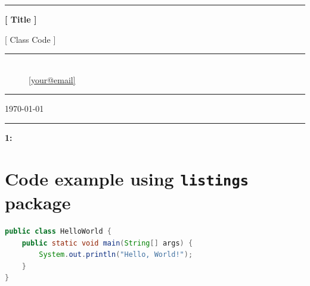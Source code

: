 \documentclass[]{article}
\begin{document}
\begin{titlepage}
    \centering

    \vspace*{1cm}

    \rule{.7\textwidth}{1pt}

    \vspace{.7\baselineskip}
    {\huge \textbf{[ Title ]}}

    \vspace*{.5cm}
    {\Large [ Class Code ]}
    
    \rule{.7\textwidth}{1pt}

    \vspace{1cm}

    \large

    \begin{figure}[!ht]
        \large
         \\
        {\normalsize \url{[your@email]}}
    \end{figure}


    \vspace{3cm}


    \vfill

    \rule{.7\textwidth}{1pt}

    \vspace*{.25cm}

    \Large \today

    \rule{.7\textwidth}{1pt}

\end{titlepage}

\noindent\textbf{1:}

\section{Code example using \texttt{listings} package}

\begin{lstlisting}[language=Java]
public class HelloWorld {
    public static void main(String[] args) {
        System.out.println("Hello, World!");
    }
}
\end{lstlisting}
\end{document}
